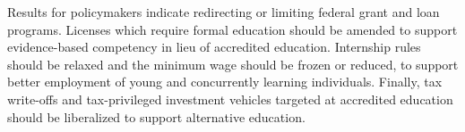 \documentclass[AER]{./aea-latex-templates/AEA}
\begin{document}
Results for policymakers indicate redirecting or limiting federal grant and loan programs.
Licenses which require formal education should be amended to support evidence-based competency in lieu of accredited education.
Internship rules should be relaxed and the minimum wage should be frozen or reduced,
to support better employment of young and concurrently learning individuals.
Finally, tax write-offs and tax-privileged
investment vehicles targeted at accredited education should be liberalized
to support alternative education.



\end{document}
